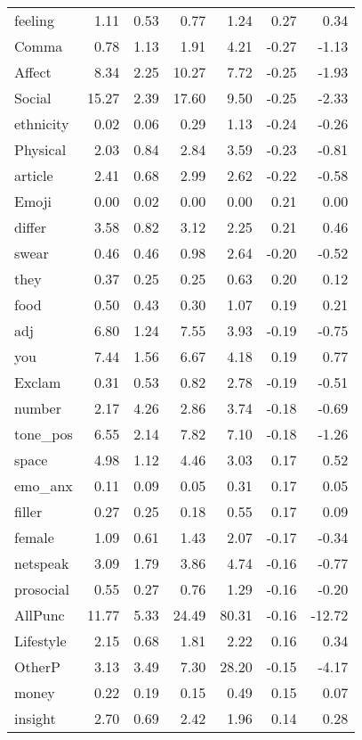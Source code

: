 \begin{longtable}{@{}p{3.4cm}rrrrrr@{}}
feeling & 1.11 & 0.53 & 0.77 & 1.24 & 0.27 & 0.34 \\
Comma & 0.78 & 1.13 & 1.91 & 4.21 & -0.27 & -1.13 \\
Affect & 8.34 & 2.25 & 10.27 & 7.72 & -0.25 & -1.93 \\
Social & 15.27 & 2.39 & 17.60 & 9.50 & -0.25 & -2.33 \\
ethnicity & 0.02 & 0.06 & 0.29 & 1.13 & -0.24 & -0.26 \\
Physical & 2.03 & 0.84 & 2.84 & 3.59 & -0.23 & -0.81 \\
article & 2.41 & 0.68 & 2.99 & 2.62 & -0.22 & -0.58 \\
Emoji & 0.00 & 0.02 & 0.00 & 0.00 & 0.21 & 0.00 \\
differ & 3.58 & 0.82 & 3.12 & 2.25 & 0.21 & 0.46 \\
swear & 0.46 & 0.46 & 0.98 & 2.64 & -0.20 & -0.52 \\
they & 0.37 & 0.25 & 0.25 & 0.63 & 0.20 & 0.12 \\
food & 0.50 & 0.43 & 0.30 & 1.07 & 0.19 & 0.21 \\
adj & 6.80 & 1.24 & 7.55 & 3.93 & -0.19 & -0.75 \\
you & 7.44 & 1.56 & 6.67 & 4.18 & 0.19 & 0.77 \\
Exclam & 0.31 & 0.53 & 0.82 & 2.78 & -0.19 & -0.51 \\
number & 2.17 & 4.26 & 2.86 & 3.74 & -0.18 & -0.69 \\
tone\_pos & 6.55 & 2.14 & 7.82 & 7.10 & -0.18 & -1.26 \\
space & 4.98 & 1.12 & 4.46 & 3.03 & 0.17 & 0.52 \\
emo\_anx & 0.11 & 0.09 & 0.05 & 0.31 & 0.17 & 0.05 \\
filler & 0.27 & 0.25 & 0.18 & 0.55 & 0.17 & 0.09 \\
female & 1.09 & 0.61 & 1.43 & 2.07 & -0.17 & -0.34 \\
netspeak & 3.09 & 1.79 & 3.86 & 4.74 & -0.16 & -0.77 \\
prosocial & 0.55 & 0.27 & 0.76 & 1.29 & -0.16 & -0.20 \\
AllPunc & 11.77 & 5.33 & 24.49 & 80.31 & -0.16 & -12.72 \\
Lifestyle & 2.15 & 0.68 & 1.81 & 2.22 & 0.16 & 0.34 \\
OtherP & 3.13 & 3.49 & 7.30 & 28.20 & -0.15 & -4.17 \\
money & 0.22 & 0.19 & 0.15 & 0.49 & 0.15 & 0.07 \\
insight & 2.70 & 0.69 & 2.42 & 1.96 & 0.14 & 0.28 \\

\end{longtable}
